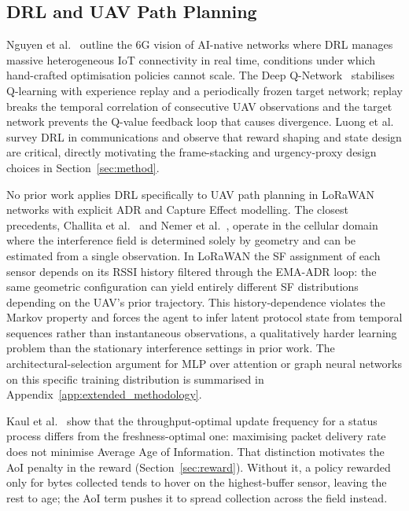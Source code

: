 \subsection{DRL and UAV Path Planning}

Nguyen et al.~\cite{nguyen20226g} outline the 6G vision of AI-native
networks where DRL manages massive heterogeneous IoT connectivity in
real time, conditions under which hand-crafted optimisation policies
cannot scale. The Deep Q-Network~\cite{mnih2015humanlevel} stabilises
Q-learning with experience replay and a periodically frozen target
network; replay breaks the temporal correlation of consecutive UAV
observations and the target network prevents the Q-value feedback
loop that causes divergence. Luong et al.~\cite{luong2019drl} survey
DRL in communications and observe that reward shaping and state
design are critical, directly motivating the frame-stacking and
urgency-proxy design choices in Section~\ref{sec:method}.

No prior work applies DRL specifically to UAV path planning in
LoRaWAN networks with explicit ADR and Capture Effect modelling. The
closest precedents, Challita et al.~\cite{challita2018interference}
and Nemer et al.~\cite{nemer2022energyefficient}, operate in the
cellular domain where the interference field is determined solely by
geometry and can be estimated from a single observation. In LoRaWAN
the SF assignment of each sensor depends on its RSSI history
filtered through the EMA-ADR loop: the same geometric configuration
can yield entirely different SF distributions depending on the UAV's
prior trajectory. This history-dependence violates the Markov
property and forces the agent to infer latent protocol state from
temporal sequences rather than instantaneous observations, a
qualitatively harder learning problem than the stationary
interference settings in prior work. The architectural-selection
argument for MLP over attention or graph neural networks on this
specific training distribution is summarised in
Appendix~\ref{app:extended_methodology}.

Kaul et al.~\cite{kaul2012realtime} show that the throughput-optimal update frequency for a status process differs from the freshness-optimal one: maximising packet delivery rate does not minimise Average Age of Information. That distinction motivates the AoI penalty in the reward (Section~\ref{sec:reward}). Without it, a policy rewarded only for bytes collected tends to hover on the highest-buffer sensor, leaving the rest to age; the AoI term pushes it to spread collection across the field instead.

